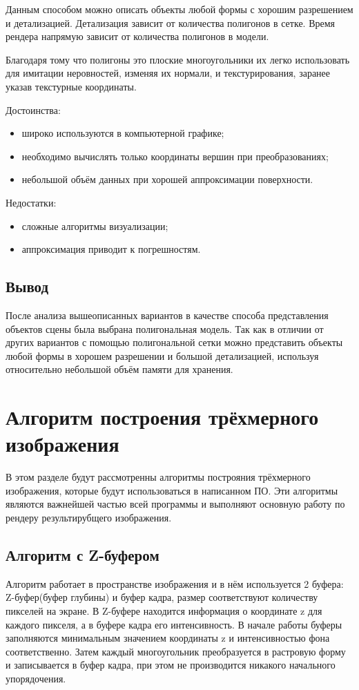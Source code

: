\documentclass[12pt,a4paper,oneside]{report}
\begin{document}
	\quad Данным способом можно описать объекты любой формы с хорошим разрешением и детализацией. Детализация зависит от количества полигонов в сетке. Время рендера напрямую зависит от количества полигонов в модели.
	
	\quad Благодаря тому что полигоны это плоские многоугольники их легко использовать для имитации неровностей, изменяя их нормали, и текстурирования, заранее указав текстурные координаты.
    		
    		\quad Достоинства:
    		\begin{itemize}
    			\item широко используются в компьютерной графике;
    			\item необходимо вычислять только координаты вершин при преобразованиях;
    			\item небольшой объём данных при хорошей аппроксимации поверхности.
    		\end{itemize}
    		\quad Недостатки:
    		\begin{itemize}
    			\item сложные алгоритмы визуализации;
    			\item аппроксимация приводит к погрешностям.
    		\end{itemize}
    		\subsection{Вывод}
    		\quad После анализа вышеописанных вариантов в качестве способа представления объектов сцены была выбрана полигональная модель. Так как в отличии от других вариантов с помощью полигональной сетки можно представить объекты любой формы в хорошем разрешении и большой детализацией, используя относительно небольшой объём памяти для хранения.
    	\section{Алгоритм построения трёхмерного изображения}
    		\quad В этом разделе будут рассмотренны алгоритмы построяния трёхмерного изображения, которые будут использоваться в написанном ПО. Эти алгоритмы являются важнейшей частью всей программы и выполняют основную работу по рендеру результирубщего изображения.
    		\subsection{Алгоритм с Z-буфером}
    			\quad Алгоритм работает в пространстве изображения и в нём используется 2 буфера: Z-буфер(буфер глубины) и буфер кадра, размер соответствуют количеству пикселей на экране. В Z-буфере находится информация о координате z для каждого пикселя, а в буфере кадра его интенсивность. В начале работы буферы заполняются минимальным значением координаты z и интенсивностью фона соответственно. Затем каждый многоугольник преобразуется в растровую форму и записывается в буфер кадра, при этом не производится никакого начального упорядочения.
    			
\end{document}
